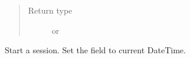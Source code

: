 \documentclass[letterpaper,10pt,english]{sphinxmanual}
\begin{document}
\begin{fulllineitems}
\begin{fulllineitems}
\begin{quote}
\begin{description}
\item[{Return type}] \leavevmode
{} or 

\end{description}\end{quote}

\end{fulllineitems}


\begin{fulllineitems}
\label{models:models.Session.Start}
Start a session.
Set the  field to current DateTime.

\end{fulllineitems}


\end{fulllineitems}

\end{document}
